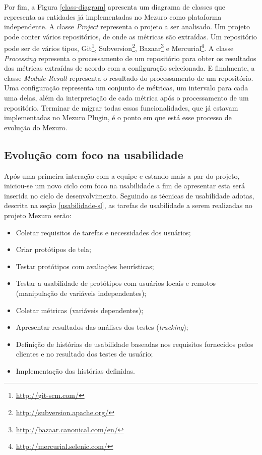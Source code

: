 Por fim, a Figura \ref{class-diagram} apresenta um diagrama de classes que representa as entidades já implementadas no Mezuro como plataforma independente. A classe \textit{Project} representa o projeto a ser analisado. Um projeto pode conter vários repositórios, de onde as métricas são extraídas.  Um repositório pode ser de vários tipos, Git\footnote{\url{http://git-scm.com/}}, Subversion\footnote{\url{http://subversion.apache.org/}}, Bazaar\footnote{\url{http://bazaar.canonical.com/en/}} e Mercurial\footnote{\url{http://mercurial.selenic.com/}}. A classe \textit{Processing} representa o processamento de um repositório para obter os resultados das métricas extraídas de acordo com a configuração selecionada. E finalmente, a classe \textit{Module-Result} representa o resultado do processamento de um repositório. Uma configuração representa um conjunto de métricas, um intervalo para cada uma delas, além da interpretação de cada métrica após o processamento de um repositório. Terminar de  migrar todas essas funcionalidades, que já estavam implementadas no Mezuro Plugin, é o ponto em que está esse processo de evolução do Mezuro.

%
\subsection{Evolução com foco na usabilidade}
\label{evolucao-usabilidade}

Após uma primeira interação com a equipe e estando mais a par do projeto, iniciou-se um novo ciclo com foco na usabilidade a fim de apresentar esta será inserida no ciclo de desenvolvimento. Seguindo as técnicas de usabilidade adotas, descrita na seção \ref{usabilidade-sl}, as tarefas de usabilidade a serem realizadas no projeto Mezuro serão:
\begin{itemize}
\item Coletar requisitos de tarefas e necessidades dos usuários;
\item Criar protótipos de tela;
\item Testar protótipos com avaliações heurísticas;
\item Testar a usabilidade de protótipos com usuários locais e remotos (manipulação de variáveis independentes);
\item Coletar métricas (variáveis dependentes);
\item Apresentar resultados das análises dos testes (\textit{tracking});
\item Definição de histórias de usabilidade baseadas nos requisitos fornecidos pelos clientes e no resultado dos testes de usuário;
\item Implementação das histórias definidas.
\end{itemize}

